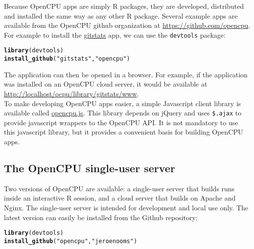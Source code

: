 \documentclass{scrartcl}\usepackage[]{graphicx}\usepackage[]{color}
\makeatletter
\newcommand{\hlstr}[1]{\textcolor[rgb]{0.192,0.494,0.8}{#1}}%
\newcommand{\hlkwd}[1]{\textcolor[rgb]{0.737,0.353,0.396}{\textbf{#1}}}%
\newenvironment{kframe}{%
 \def\at@end@of@kframe{}%
 \ifinner\ifhmode%
  \def\at@end@of@kframe{\end{minipage}}%
  \begin{minipage}{\columnwidth}%
 \fi\fi%
 \def\FrameCommand##1{\hskip\@totalleftmargin \hskip-\fboxsep
 \colorbox{shadecolor}{##1}\hskip-\fboxsep
     \hskip-\linewidth \hskip-\@totalleftmargin \hskip\columnwidth}%
 \MakeFramed {\advance\hsize-\width
   \@totalleftmargin\z@ \linewidth\hsize
   \@setminipage}}%
 {\par\unskip\endMakeFramed%
 \at@end@of@kframe}
\newenvironment{knitrout}{}{} %
\makeatother
\begin{document}
\noindent Because OpenCPU apps are simply R packages, they are developed, distributed and installed the same way as any other R package. Several example apps are available from the OpenCPU github organization at \href{https://github.com/opencpu}{https://github.com/opencpu}. For example to install the \href{https://github.com/opencpu/gitstats}{gitstats} app, we can use the \texttt{devtools} package:

\begin{knitrout}
\color{fgcolor}\begin{kframe}
\begin{alltt}
\hlkwd{library}(devtools)
\hlkwd{install_github}(\hlstr{"gitstats"}, \hlstr{"opencpu"})
\end{alltt}
\end{kframe}
\end{knitrout}


\noindent The application can then be opened in a browser. For example, if the application was installed on an OpenCPU cloud server, it would be available at \href{http://localhost/ocpu/library/gitstats/www}{http://localhost/ocpu/library/gitstats/www}. \\

\noindent To make developing OpenCPU apps easier, a simple Javascript client library is available called \href{https://github.com/jeroenooms/opencpu.js}{opencpu.js}. This library depends on jQuery and  uses \texttt{\$.ajax} to provide javascript wrappers to the OpenCPU API. It is not mandatory to use this javascript library, but it provides a convenient basis for building OpenCPU apps.

\subsection{The OpenCPU single-user server}

Two versions of OpenCPU are available: a single-user server that builds runs inside an interactive R session, and a cloud server that builds on Apache and Nginx. The single-user server is intended for development and local use only. The latest version can easily be installed from the Github repository:

\begin{knitrout}
\color{fgcolor}\begin{kframe}
\begin{alltt}
\hlkwd{library}(devtools)
\hlkwd{install_github}(\hlstr{"opencpu"}, \hlstr{"jeroenooms"})
\end{alltt}
\end{kframe}
\end{knitrout}
\end{document}
